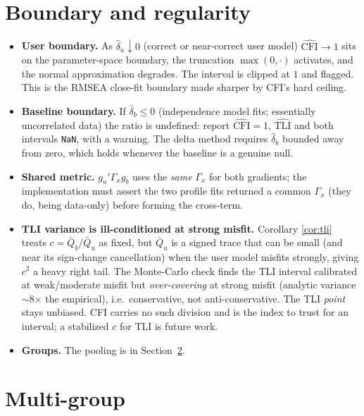 \documentclass[11pt]{article}
\newcommand{\cfi}{\widehat{\mathrm{CFI}}}
\newcommand{\tli}{\widehat{\mathrm{TLI}}}
\theoremstyle{plain}
\theoremstyle{remark}
\begin{document}
\section{Boundary and regularity}\label{sec:boundary}

\begin{itemize}
\item \textbf{User boundary.} As $\hat\delta_u\downarrow0$ (correct or
near-correct user model) $\cfi\to1$ sits on the parameter-space boundary, the
truncation $\max(0,\cdot)$ activates, and the normal approximation degrades.
The interval is clipped at $1$ and flagged. This is the RMSEA close-fit boundary
made sharper by CFI's hard ceiling.
\item \textbf{Baseline boundary.} If $\hat\delta_b\le0$ (independence model
fits; essentially uncorrelated data) the ratio is undefined: report
$\cfi=1$, $\tli$ and both intervals \texttt{NaN}, with a warning. The delta
method requires $\hat\delta_b$ bounded away from zero, which holds whenever the
baseline is a genuine null.
\item \textbf{Shared metric.} $g_u'\Gamma_x g_b$ uses the \emph{same} $\Gamma_x$
for both gradients; the implementation must assert the two profile fits returned
a common $\Gamma_x$ (they do, being data-only) before forming the cross-term.
\item \textbf{TLI variance is ill-conditioned at strong misfit.} Corollary
\ref{cor:tli} treats $c=\bar Q_b/\bar Q_u$ as fixed, but $\bar Q_u$ is a signed
trace that can be small (and near its sign-change cancellation) when the user
model misfits strongly, giving $c^2$ a heavy right tail. The Monte-Carlo check
finds the TLI interval calibrated at weak/moderate misfit but
\emph{over-covering} at strong misfit (analytic variance $\sim$8$\times$ the
empirical), i.e.\ conservative, not anti-conservative. The TLI \emph{point}
stays unbiased. CFI carries no such division and is the index to trust for an
interval; a stabilized $c$ for TLI is future work.
\item \textbf{Groups.} The pooling is in Section~\ref{sec:multigroup}.
\end{itemize}

\section{Multi-group}\label{sec:multigroup}
\end{document}
